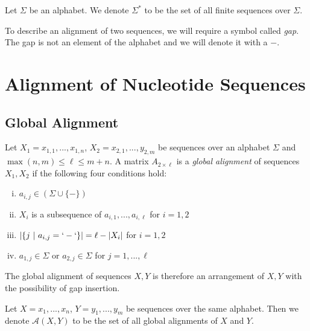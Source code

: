 \begin{definition}[Iteration] Let $\Sigma$ be an alphabet. We denote $\Sigma^*$ to be the set of all finite sequences over $\Sigma$.
\end{definition}

To describe an alignment of two sequences, we will require a symbol called \textit{gap}. The gap is not an element of the alphabet and we will denote it with a $-$.



\section{Alignment of Nucleotide Sequences}
\subsection{Global Alignment}
\begin{definition}
Let $X_1 = x_{1,1},...,x_{1,n}$, $X_2 = x_{2,1}, ..., y_{2,m}$ be sequences over an alphabet $\Sigma$ and $\max(n,m) \leq \ell \leq m+n$. A matrix $A_{2 \times \ell}$ is a \textit{global alignment} of sequences $X_1, X_2$ if the following four conditions hold:

\begin{enumerate}[(i)]
    \item $a_{i,j} \in (\Sigma \cup \{-\})$
    \item $X_i$ is a subsequence of $a_{i,1},...,a_{i,\ell}$ for $i=1,2$
    \item $|\{j ~|~ a_{i,j} = `-`\}| = \ell - |X_i|$ for $i=1, 2$
    \item $a_{1, j} \in \Sigma$ or $a_{2, j} \in \Sigma$ for $j = 1,...,\ell$
\end{enumerate}
\end{definition}

The global alignment of sequences $X,Y$ is therefore an arrangement of $X,Y$ with the possibility of gap insertion.

\begin{definition} Let $X = x_1,...,x_n$, $Y = y_1, ..., y_m$ be sequences over the same alphabet. Then we denote $\mathcal{A}(X,Y)$ to be the set of all global alignments of $X$ and $Y$.
\end{definition}

